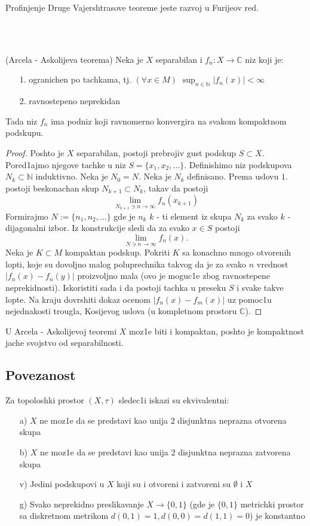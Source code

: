 \documentclass[a4paper,12pt]{article}
\newcommand{\NN}{\mathbb{N}}
\newcommand{\CC}{\mathbb{C}}
\newcommand{\ps}{\subset}
\begin{document}
\begin{nap}
Profinjenje Druge Vajershtrasove teoreme jeste razvoj u Furijeov red.
\end{nap}
\\ \\
\begin{tma}
(Arcela - Askolijeva teorema) Neka je $X$ separabilan i $f_n: X \to \CC$ niz koji je:
\begin{itemize}
\item[1.] ogranichen po tachkama, tj. $(\forall x \in M)$ $\sup_{n \in \NN} |f_n(x)| < \infty$
\item[2.] ravnostepeno neprekidan
\end{itemize}
Tada niz $f_n$ ima podniz koji ravnomerno konvergira na svakom kompaktnom podskupu.
\end{tma}
\begin{proof}
Poshto je $X$ separabilan, postoji prebrojiv gust podskup $S \ps X$. Pored1ajmo njegove tachke u niz $S = \{x_1, x_2, \dots \}$. Definishimo niz podskupova $N_k \ps \NN$ induktivno. Neka je $N_0 = N$. Neka je $N_k$ definisano. Prema uslovu $1.$ postoji beskonachan skup $N_{k+1} \ps N_k$, takav da postoji 
\[\lim_{ N_{k+1}\ni n \to \infty} f_n(x_{k+1}) \]
Formirajmo $N := \{n_1, n_2, \dots \}$ gde je $n_k$ $k$ - ti element iz skupa $N_k$ za svako $k$ - dijagonalni izbor. Iz konstrukcije
sledi da za svako $x\in S$ postoji
	\[ \lim_{N\ni n \to \infty}f_n(x) .\] 
	Neka je $K\ps M$ kompaktan podskup. Pokriti $K$ sa konachno mnogo otvorenih lopti, koje su dovoljno malog poluprechnika takvog
	da je za svako  $n$ vrednost $|f_n(x) - f_n(y)|$ proizvoljno mala (ovo je moguc1e zbog ravnostepene neprekidnosti).
	Iskoristiti sada i da postoji tachka u preseku $S$ i svake takve lopte. Na kraju dovrshiti dokaz ocenom
	$|f_n(x) - f_m(x)|$ uz pomoc1u nejednakosti trougla, Kosijevog uslova (u kompletnom prostoru $\CC$).
\end{proof}

\begin{nap}
U Arcela - Askolijevoj teoremi $X$ moz1e biti i kompaktan, poshto je kompakt\-nost jache svojstvo od separabilnosti.
\end{nap}
\subsection{Povezanost}

\begin{tma}
Za topoloshki prostor $(X, \tau)$ sledec1i iskazi su ekvivalentni:
\begin{itemize}
\item[a)] $X$ ne moz1e da se predstavi kao unija $2$ disjunktna neprazna otvorena skupa
\item[b)]  $X$ ne moz1e da se predstavi kao unija $2$ disjunktna neprazna zatvorena skupa
\item[v)] Jedini podskupovi u $X$ koji su i otvoreni i zatvoreni su $\emptyset$ i $X$
\item[g)] Svako neprekidno preslikavanje $X \to \{0,1\}$ (gde je $\{0,1\}$ metrichki prostor sa diskretnom metrikom $d(0,1) = 1, d(0,0) = d(1,1) = 0$) je konstantno
\end{itemize}
\end{tma}
\end{document}
